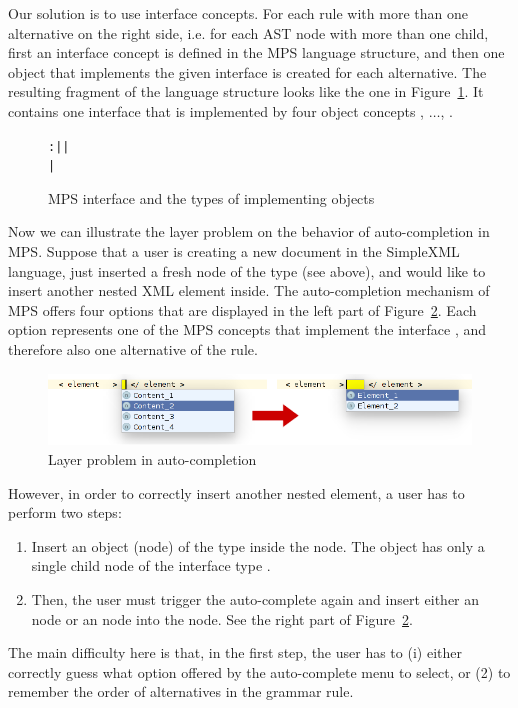 Our solution is to use interface concepts.
For each rule with more than one alternative on the right side, i.e. for each AST node with more than one child, first an interface concept is defined in the MPS language structure, and then one object that implements the given interface is created for each alternative.
The resulting fragment of the language structure looks like the one in Figure~\ref{fig:ICONTENTITF}.
It contains one interface  that is implemented by four object concepts , $\ldots$, .

\begin{figure}[ht]
\centering
\begin{alltt}
\small
{} :  |  |
            | 
\end{alltt}
\caption{MPS interface  and the types of implementing objects}
\label{fig:ICONTENTITF}
\end{figure}

Now we can illustrate the layer problem on the behavior of auto-completion in MPS.
Suppose that a user is creating a new document in the SimpleXML language, just inserted a fresh node of the type  (see above), and would like to insert another nested XML element inside.
The auto-completion mechanism of MPS offers four options that are displayed in the left part of Figure~\ref{fig:LAYERPROBLEM}.
Each option represents one of the MPS concepts that implement the interface , and therefore also one alternative of the  rule.

\begin{figure}[ht]
	\centering
	\includegraphics[scale=0.5]{./images/layer_problem.png}
	\caption{Layer problem in auto-completion}
	\label{fig:LAYERPROBLEM}
\end{figure}

However, in order to correctly insert another nested element, a user has to perform two steps:
\begin{enumerate}
	\item Insert an object (node) of the type  inside the  node. The  object has only a single child node of the interface type .
	\item Then, the user must trigger the auto-complete again and insert either an  node or an  node into the  node. See the right part of Figure~\ref{fig:LAYERPROBLEM}.
\end{enumerate}
The main difficulty here is that, in the first step, the user has to (i) either correctly guess what option offered by the auto-complete menu to select, or (2) to remember the order of alternatives in the grammar rule.

